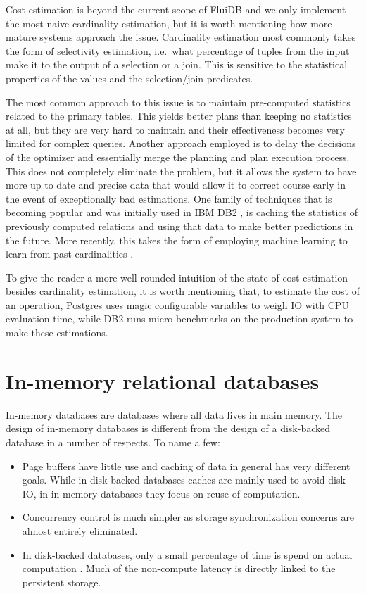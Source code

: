 Cost estimation is beyond the current scope of FluiDB and we only implement
the most naive cardinality estimation, but it is worth mentioning how
more mature systems approach the issue. Cardinality estimation most
commonly takes the form of selectivity estimation, i.e.\  what
percentage of tuples from the input make it to the output of a
selection or a join. This is sensitive to the statistical
properties of the values and the selection/join predicates.

The most common approach to this issue is to maintain pre-computed
statistics related to the primary tables. This yields better plans than
keeping no statistics at all, but they are very hard to maintain and their
effectiveness becomes very limited for complex queries. Another
approach employed is to delay the decisions of the optimizer and
essentially merge the planning and plan execution process. This does not
completely eliminate the problem, but it allows the system to have more
up to date and precise data that would allow it to correct course
early in the event of exceptionally bad estimations. One family of
techniques that is becoming popular and was initially used in IBM DB2
\cite{stillgerLEODB2LearningOptimizer2001}, is caching the statistics
of previously computed relations and using that data to make better
predictions in the future. More recently, this takes the form of
employing machine learning to learn from past cardinalities
\cite{ortizEmpiricalAnalysisDeep2019}.

To give the reader a more well-rounded intuition of the state of cost
estimation besides cardinality estimation, it is worth mentioning that,
to estimate the cost of an operation, Postgres uses magic configurable
variables to weigh IO with CPU evaluation time, while DB2 runs
micro-benchmarks on the production system to make these estimations.


\section{In-memory relational databases}

In-memory databases are databases where all data lives in main
memory. The design of in-memory databases is different from the design
of a disk-backed database in a number of respects. To name a few:

\begin{itemize}
\item Page buffers have little use and caching of data in general has very
different goals. While in disk-backed databases caches are mainly used to
avoid disk IO, in in-memory databases they focus on reuse of computation.
\item Concurrency control is much simpler as storage synchronization
concerns are almost entirely eliminated.
\item In disk-backed databases, only a small percentage of time is spend on
actual computation \cite{harizopoulosOLTPLookingGlass2018}. Much of
the non-compute latency is directly linked to the persistent
storage.
\end{itemize}

